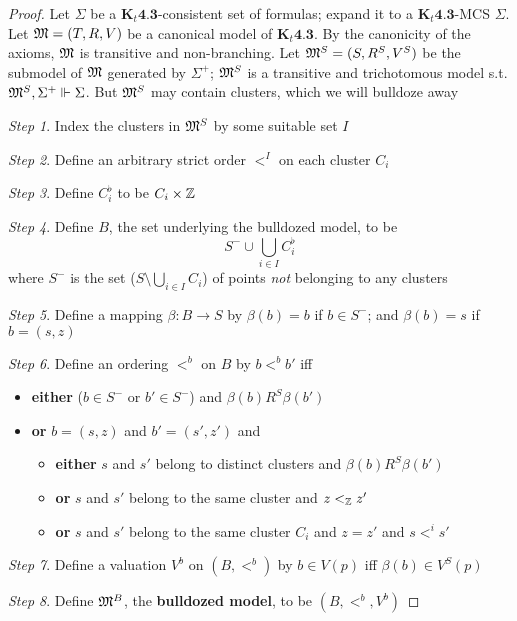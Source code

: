 \documentclass[11pt]{article}
\begin{document}
\begin{proof}
Let \(\Sigma\) be a \(\textbf{K}_t\textbf{4.3}\)-consistent set of formulas; expand it
to a \(\textbf{K}_t\textbf{4.3}\)-MCS \(\Sigma\). Let \(\mathfrak{M}=(T,R,V)\) be a canonical
model of \(\textbf{K}_t\textbf{4.3}\). By the canonicity of the axioms,
\(\mathfrak{M}\) is transitive and non-branching. Let \(\mathfrak{M}^S=(S,R^S,V^S)\) be the
submodel of \(\mathfrak{M}\) generated by \(\Sigma^+\); \(\mathfrak{M}^S\) is a transitive and
trichotomous model s.t. \(\mathfrak{M}^S,\Sigma^+\Vdash\Sigma\). But \(\mathfrak{M}^S\) may contain
clusters, which we will bulldoze away

\emph{Step 1}. Index the clusters in \(\mathfrak{M}^S\) by some suitable set \(I\)

\emph{Step 2}. Define an arbitrary strict order \(<^I\) on each cluster \(C_i\)

\emph{Step 3}. Define \(C^\flat_i\) to be \(C_i\times\mathbb{Z}\)

\emph{Step 4}. Define \(B\), the set underlying the bulldozed model, to be
\begin{equation*}
S^-\cup\bigcup_{i\in I}C_i^\flat
\end{equation*}
where \(S^-\) is the set (\(S\setminus\bigcup_{i\in I}C_i\)) of points \emph{not}
belonging to any clusters

\emph{Step 5}. Define a mapping \(\beta:B\to S\) by \(\beta(b)=b\) if \(b\in S^-\); and
\(\beta(b)=s\) if \(b=(s,z)\)

\emph{Step 6}. Define an ordering \(<^b\) on \(B\) by \(b<^b b'\) iff
\begin{itemize}
\item \textbf{either} (\(b\in S^-\) or \(b'\in S^-\)) and \(\beta(b)R^S\beta(b')\)
\item \textbf{or} \(b=(s,z)\) and \(b'=(s',z')\) and
\begin{itemize}
\item \textbf{either} \(s\) and \(s'\) belong to distinct clusters and \(\beta(b)R^S\beta(b')\)
\item \textbf{or} \(s\) and \(s'\) belong to the same cluster and \(z<_{\mathbb{Z}} z'\)
\item \textbf{or} \(s\) and \(s'\) belong to the same cluster \(C_i\) and \(z=z'\) and
\(s<^i s'\)
\end{itemize}
\end{itemize}


\emph{Step 7}. Define a valuation \(V^b\) on \((B,<^b)\) by \(b\in V(p)\) iff
\(\beta(b)\in V^S(p)\)

\emph{Step 8}. Define \(\mathfrak{M}^B\), the \textbf{bulldozed model}, to be \((B,<^b,V^b)\)
\end{proof}
\end{document}
